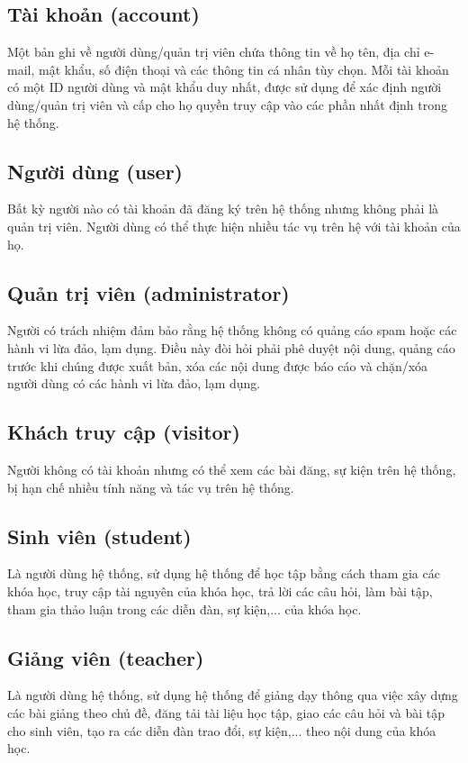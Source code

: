\documentclass[./../main_file.tex]{subfiles}
\begin{document}
\subsection{Tài khoản (account)}

Một bản ghi về người dùng/quản trị viên chứa thông tin về họ tên, địa chỉ e-mail, mật khẩu, số điện thoại và các thông tin cá nhân tùy chọn. Mỗi tài khoản có một ID người dùng và mật khẩu duy nhất, được sử dụng để xác định người dùng/quản trị viên và cấp cho họ quyền truy cập vào các phần nhất định trong hệ thống.

\subsection{Người dùng (user)}
Bất kỳ người nào có tài khoản đã đăng ký trên hệ thống nhưng không phải là quản trị viên. Người dùng có thể thực hiện nhiều tác vụ trên hệ với tài khoản của họ.

\subsection{Quản trị viên (administrator)}
Người có trách nhiệm đảm bảo rằng hệ thống không có quảng cáo spam hoặc các hành vi lừa đảo, lạm dụng. Điều này đòi hỏi phải phê duyệt nội dung, quảng cáo trước khi chúng được xuất bản, xóa các nội dung được báo cáo và chặn/xóa người dùng có các hành vi lừa đảo, lạm dụng.

\subsection{Khách truy cập (visitor)}
Người không có tài khoản nhưng có thể xem các bài đăng, sự kiện trên hệ thống, bị hạn chế nhiều tính năng và tác vụ trên hệ thống. 

\subsection{Sinh viên (student)}
Là người dùng hệ thống, sử dụng hệ thống để học tập bằng cách tham gia các khóa học, truy cập tài nguyên của khóa học, trả lời các câu hỏi, làm bài tập, tham gia thảo luận trong các diễn đàn, sự kiện,... của khóa học.

\subsection{Giảng viên (teacher)}
Là người dùng hệ thống, sử dụng hệ thống để giảng dạy thông qua việc xây dựng các bài giảng theo chủ đề, đăng tải tài liệu học tập, giao các câu hỏi và bài tập cho sinh viên, tạo ra các diễn đàn trao đổi, sự kiện,... theo nội dung của khóa học.
\end{document}
